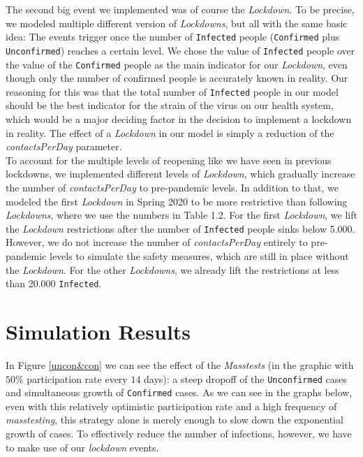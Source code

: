 \documentclass
[
    report,
    11pt,
    bibliography = totoc,
    listof = totoc,
    headinclude = true,
]
{scrreport}
\begin{document}
The second big event we implemented was of course the \textit{Lockdown}. To be precise,
we modeled multiple different version of \textit{Lockdowns}, but all with the same basic idea:
The events trigger once the number of \texttt{Infected} people (\texttt{Confirmed} plus \texttt{Unconfirmed})
reaches a certain level.
We chose the value of \texttt{Infected} people over the value of
the \texttt{Confirmed} people as the main indicator for our \textit{Lockdown}, even though only the number of confirmed people is accurately known in reality.
Our reasoning for this was that the total number of \texttt{Infected} people in our
model should be the best indicator for the strain of the virus on our health system,
which would be a major deciding factor in the decision to implement a lockdown in reality.
The effect of a \textit{Lockdown} in our model is simply a reduction of the \textit{contactsPerDay} parameter. \\
To account for the multiple levels of reopening like we have seen in previous
lockdowns, we implemented different levels of \textit{Lockdown}, which gradually increase
the number of \textit{contactsPerDay} to pre-pandemic levels.
In addition to that, we modeled the first \textit{Lockdown} in Spring 2020 to be more
restrictive than following \textit{Lockdowns}, where we use the numbers in Table 1.2.
For the first \textit{Lockdown}, we lift the \textit{Lockdown} restrictions after the number of \texttt{Infected}
people sinks below 5.000. However, we do not increase the number of \textit{contactsPerDay}
entirely to pre-pandemic levels to simulate the safety measures, which are still
in place without the \textit{Lockdown}.
For the other \textit{Lockdowns}, we already lift the restrictions at less than 20.000 \texttt{Infected}.


\begingroup
\renewcommand{\cleardoublepage}{}
\renewcommand{\clearpage}{}
\chapter{Simulation Results}
\endgroup

In Figure \ref{uncon&con} we can see the effect of the \textit{Masstests} (in the graphic with $50 \%$ participation rate every $14$ days): a steep dropoff of the \texttt{Unconfirmed} cases and simultaneous growth of \texttt{Confirmed} cases.
As we can see in the graphs below, even with this relatively optimistic participation rate
and a high frequency of \textit{masstesting}, this strategy alone is merely enough
to slow down the exponential growth of cases.
To effectively reduce the number of infections, however, we have to make use of our \textit{lockdown} events.
\end{document}
